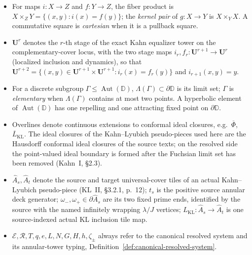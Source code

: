\begin{itemize}
\item For maps \(i\colon X\to Z\) and \(f\colon Y\to Z\), the fiber product is \(X\times_ZY=\{(x,y):i(x)=f(y)\}\); the \emph{kernel pair} of \(g\colon X\to Y\) is \(X\times_YX\).  A commutative square is \emph{cartesian} when it is a pullback square.

\item \(\mathbf U^r\) denotes the \(r\)-th stage of the exact Kahn equalizer tower on the complementary-cover locus, with the two stage maps \(i_r,f_r\colon\mathbf U^{r+1}\to\mathbf U^{r}\) (localized inclusion and dynamics), so that
\(\mathbf U^{r+2}=\{(x,y)\in\mathbf U^{r+1}\times\mathbf U^{r+1}:i_r(x)=f_r(y)\}\) and \(i_{r+1}(x,y)=y\).

\item For a discrete subgroup \(\Gamma\le\operatorname{Aut}(\mathbb D)\), \(\Lambda(\Gamma)\subset\partial\mathbb D\) is its limit set; \(\Gamma\) is \emph{elementary} when \(\Lambda(\Gamma)\) contains at most two points.  A hyperbolic element of \(\operatorname{Aut}(\mathbb D)\) has one repelling and one attracting fixed point on \(\partial\mathbb D\).

\item Overlines denote continuous extensions to conformal ideal closures, e.g.\ \(\overline\Phi\), \(\overline L_{\mathrm{KL}}\).  The ideal closures of the Kahn--Lyubich pseudo-pieces used here are the Hausdorff conformal ideal closures of the source texts; on the resolved side the point-valued ideal boundary is formed after the Fuchsian limit set has been removed (Kahn~I, \S2.3).

\item \(\widehat A_s,\widehat A_t\) denote the source and target universal-cover tiles of an actual Kahn--Lyubich pseudo-piece (KL~II, \S3.2.1, p.~12); \(t_s\) is the positive source annular deck generator; \(\omega_-,\omega_+\in\partial\widehat A_s\) are its two fixed prime ends, identified by the source with the named infinitely wrapping \(\lambda/J\) vertices; \(L_{\mathrm{KL}}\colon\widehat A_s\to\widehat A_t\) is one source-indexed actual KL inclusion tile map.

\item \(\mathcal E,\mathcal R,T,q,e,L,N,G,H,h,\zeta_\pm\) always refer to the canonical resolved system and its annular-tower typing, Definition~\ref{def:canonical-resolved-system}.
\end{itemize}